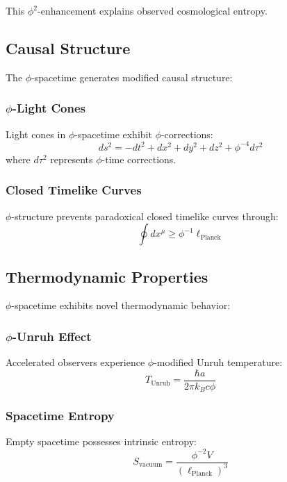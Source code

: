 This $\phi^2$-enhancement explains observed cosmological entropy.

\subsection{Causal Structure}

The $\phi$-spacetime generates modified causal structure:

\subsubsection{$\phi$-Light Cones}

Light cones in $\phi$-spacetime exhibit $\phi$-corrections:
\begin{equation}
ds^2 = -dt^2 + dx^2 + dy^2 + dz^2 + \phi^{-4} d\tau^2
\end{equation}
where $d\tau^2$ represents $\phi$-time corrections.

\subsubsection{Closed Timelike Curves}

$\phi$-structure prevents paradoxical closed timelike curves through:
\begin{equation}
\oint dx^\mu \geq \phi^{-1} \ell_{\text{Planck}}
\end{equation}

\subsection{Thermodynamic Properties}

$\phi$-spacetime exhibits novel thermodynamic behavior:

\subsubsection{$\phi$-Unruh Effect}

Accelerated observers experience $\phi$-modified Unruh temperature:
\begin{equation}
T_{\text{Unruh}} = \frac{\hbar a}{2\pi k_B c \phi}
\end{equation}

\subsubsection{Spacetime Entropy}

Empty spacetime possesses intrinsic entropy:
\begin{equation}
S_{\text{vacuum}} = \frac{\phi^{-2} V}{(\ell_{\text{Planck}})^3}
\end{equation}

